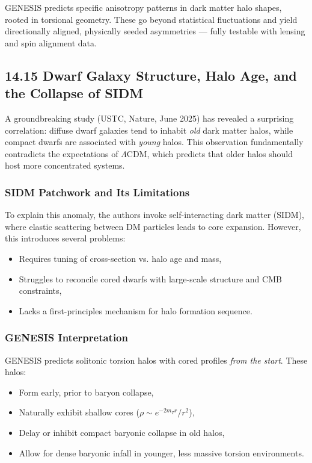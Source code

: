 \documentclass{article}
\begin{document}
\begin{tcolorbox}[colback=gray!5, colframe=black!30, title=Why this matters]
GENESIS predicts specific anisotropy patterns in dark matter halo shapes, rooted in torsional geometry. These go beyond statistical fluctuations and yield directionally aligned, physically seeded asymmetries — fully testable with lensing and spin alignment data.
\end{tcolorbox}


\subsection*{14.15 Dwarf Galaxy Structure, Halo Age, and the Collapse of SIDM}
\label{sec:dwarf_torsion_test}

A groundbreaking study (USTC, Nature, June 2025) has revealed a surprising correlation: diffuse dwarf galaxies tend to inhabit \textit{old} dark matter halos, while compact dwarfs are associated with \textit{young} halos. This observation fundamentally contradicts the expectations of $\Lambda$CDM, which predicts that older halos should host more concentrated systems.

\subsubsection*{SIDM Patchwork and Its Limitations}
To explain this anomaly, the authors invoke self-interacting dark matter (SIDM), where elastic scattering between DM particles leads to core expansion. However, this introduces several problems:
\begin{itemize}
  \item Requires tuning of cross-section vs. halo age and mass,
  \item Struggles to reconcile cored dwarfs with large-scale structure and CMB constraints,
  \item Lacks a first-principles mechanism for halo formation sequence.
\end{itemize}

\subsubsection*{GENESIS Interpretation}
GENESIS predicts solitonic torsion halos with cored profiles \emph{from the start}. These halos:
\begin{itemize}
  \item Form early, prior to baryon collapse,
  \item Naturally exhibit shallow cores ($\rho \sim e^{-2 m_T r}/r^2$),
  \item Delay or inhibit compact baryonic collapse in old halos,
  \item Allow for dense baryonic infall in younger, less massive torsion environments.
\end{itemize}
\end{document}

